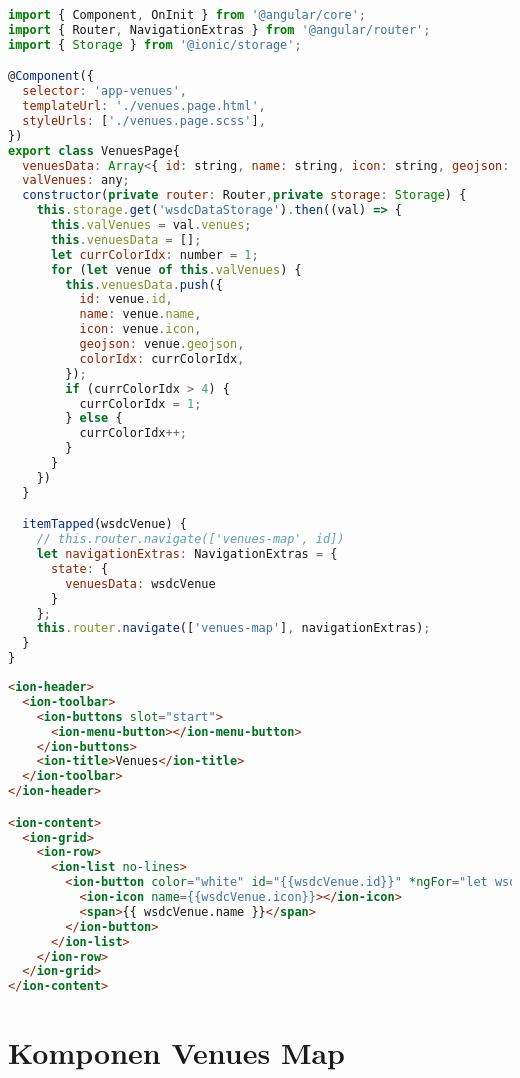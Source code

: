 \begin{lstlisting}[language=JavaScript, label={lst:venues.page.ts}, caption=venues.page.ts]
import { Component, OnInit } from '@angular/core';
import { Router, NavigationExtras } from '@angular/router';
import { Storage } from '@ionic/storage';

@Component({
  selector: 'app-venues',
  templateUrl: './venues.page.html',
  styleUrls: ['./venues.page.scss'],
})
export class VenuesPage{
  venuesData: Array<{ id: string, name: string, icon: string, geojson: any, colorIdx: number }>;
  valVenues: any;
  constructor(private router: Router,private storage: Storage) {
    this.storage.get('wsdcDataStorage').then((val) => {
      this.valVenues = val.venues;
      this.venuesData = [];
      let currColorIdx: number = 1;
      for (let venue of this.valVenues) {
        this.venuesData.push({
          id: venue.id,
          name: venue.name,
          icon: venue.icon,
          geojson: venue.geojson,
          colorIdx: currColorIdx,
        });
        if (currColorIdx > 4) {
          currColorIdx = 1;
        } else {
          currColorIdx++;
        }
      }
    })
  }

  itemTapped(wsdcVenue) {
    // this.router.navigate(['venues-map', id])
    let navigationExtras: NavigationExtras = {
      state: {
        venuesData: wsdcVenue
      }
    };
    this.router.navigate(['venues-map'], navigationExtras);
  }
}

\end{lstlisting} 

\begin{lstlisting}[language=html, label={lst:venues.page.html}, caption=venues.page.html]
<ion-header>
  <ion-toolbar>
    <ion-buttons slot="start">
      <ion-menu-button></ion-menu-button>
    </ion-buttons>
    <ion-title>Venues</ion-title>
  </ion-toolbar>
</ion-header>

<ion-content>
  <ion-grid>
    <ion-row>
      <ion-list no-lines>
        <ion-button color="white" id="{{wsdcVenue.id}}" *ngFor="let wsdcVenue of venuesData" (click)="itemTapped(wsdcVenue)">
          <ion-icon name={{wsdcVenue.icon}}></ion-icon>
          <span>{{ wsdcVenue.name }}</span>
        </ion-button>
      </ion-list>
    </ion-row>
  </ion-grid>
</ion-content>

\end{lstlisting}

\section{Komponen Venues Map} 
\label{sec:lampiranKomponenVenuesMap}

